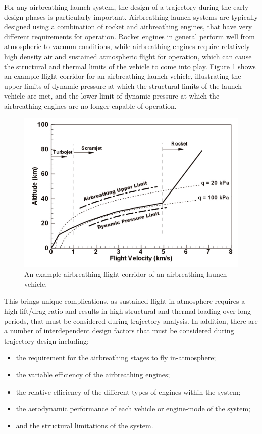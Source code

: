  
For any airbreathing launch system, the design of a trajectory during the early design phases is particularly important. Airbreathing launch systems are typically designed using a combination of rocket and airbreathing engines, that have very different requirements for operation. Rocket engines in general perform well from atmospheric to vacuum conditions, while airbreathing engines require relatively high density air and sustained atmospheric flight for operation, which can cause the structural and thermal limits of the vehicle to come into play\cite{Preller2017b}. Figure \ref{fig:FlightCorridor} shows an example flight corridor for an airbreathing launch vehicle, illustrating the upper limits of dynamic pressure at which the structural limits of the launch vehicle are met, and the lower limit of dynamic pressure at which the airbreathing engines are no longer capable of operation. 
\begin{figure}[ht]
	\centering
	\includegraphics[width=0.7\linewidth]{figures/2_literature-review/FlightCorridor}
	\caption{An example airbreathing flight corridor of an airbreathing launch vehicle\cite{Smart2007a}.}
	\label{fig:FlightCorridor}
\end{figure}
This brings unique complications, as sustained flight in-atmosphere requires a high lift/drag ratio and results in high structural and thermal loading over long periods, that must be considered during trajectory analysis. In addition, there are a number of interdependent design factors that must be considered during trajectory design including;
\begin{itemize}
	\item the requirement for the airbreathing stages to fly in-atmosphere;
	\item the variable efficiency of the airbreathing engines;
	\item the relative efficiency of the different types of engines within the system;
	\item the aerodynamic performance of each vehicle or engine-mode of the system;
	\item and the structural limitations of the system.
\end{itemize}
